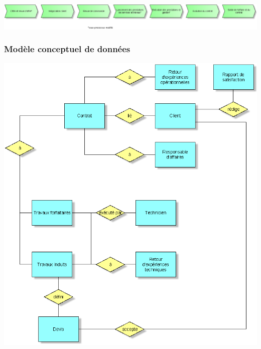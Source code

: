 \begin {center}
\includegraphics[width=\textwidth]{png_cible_fonctionnelle/DCPV.png}
\end {center}


\subsubsection{Modèle conceptuel de données}

\begin {center}
\includegraphics[width=\textwidth]{png_cible_fonctionnelle/MCD.png}
\end {center}


